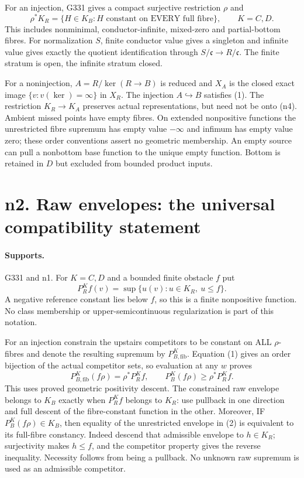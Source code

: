 \documentclass[11pt]{article}
\begin{document}
For an injection, G331 gives a compact surjective restriction $\rho$ and
\[
 \rho^*K_R=\{H\in K_B:H\text{ constant on EVERY full fibre}\},\qquad K=C,D. \tag{1}
\]
This includes nonminimal, conductor-infinite, mixed-zero and partial-bottom fibres. For normalization $S$, finite conductor value gives a singleton and infinite value gives exactly the quotient identification through $S/\mathfrak c\to R/\mathfrak c$. The finite stratum is open, the infinite stratum closed.

For a noninjection, $A=R/\ker(R\to B)$ is reduced and $X_A$ is the closed exact image $\{v:v(\ker)=\infty\}$ in $X_R$. The injection $A\hookrightarrow B$ satisfies (1). The restriction $K_R\to K_A$ preserves actual representations, but need not be onto (n4). Ambient missed points have empty fibres. On extended nonpositive functions the unrestricted fibre supremum has empty value $-\infty$ and infimum has empty value zero; these order conventions assert no geometric membership. An empty source can pull a nonbottom base function to the unique empty function. Bottom is retained in $D$ but excluded from bounded product inputs.


\section{n2. Raw envelopes: the universal compatibility statement}
\paragraph{Supports.} G331 and n1.
For $K=C,D$ and a bounded finite obstacle $f$ put
\[
 P_R^Kf(v)=\sup\{u(v):u\in K_R,\ u\le f\}.
\]
A negative reference constant lies below $f$, so this is a finite nonpositive function. No class membership or upper-semicontinuous regularization is part of this notation.

For an injection constrain the upstairs competitors to be constant on ALL $\rho$-fibres and denote the resulting supremum by $P_{B,\mathrm{fib}}^K$. Equation (1) gives an order bijection of the actual competitor sets, so evaluation at any $w$ proves
\[
 P_{B,\mathrm{fib}}^K(f\rho)=\rho^*P_R^Kf,\qquad
 P_B^K(f\rho)\ge\rho^*P_R^Kf. \tag{2}
\]
This uses proved geometric positivity descent. The constrained raw envelope belongs to $K_B$ exactly when $P_R^Kf$ belongs to $K_R$: use pullback in one direction and full descent of the fibre-constant function in the other. Moreover, IF $P_B^K(f\rho)\in K_B$, then equality of the unrestricted envelope in (2) is equivalent to its full-fibre constancy. Indeed descend that admissible envelope to $h\in K_R$; surjectivity makes $h\le f$, and the competitor property gives the reverse inequality. Necessity follows from being a pullback. No unknown raw supremum is used as an admissible competitor.
\end{document}
